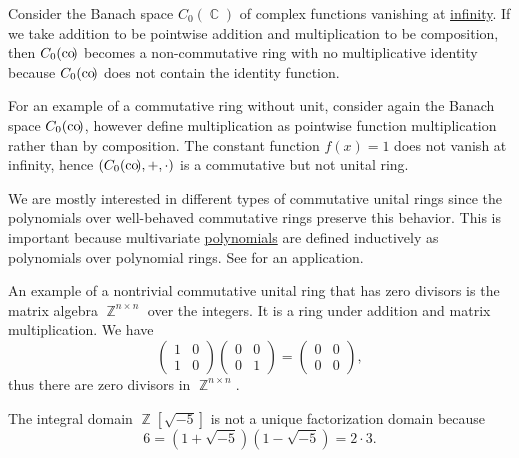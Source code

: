 \begin{example}
\begin{refenum}
     Consider the Banach space \( C_0(\BbbC) \) of complex functions vanishing at \hyperref[def:function_spaces/c0]{infinity}. If we take addition to be pointwise addition and multiplication to be composition, then \( C_0(\operatorname*{co\negthinspace)} \) becomes a non-commutative ring with no multiplicative identity because \( C_0(\operatorname*{co\negthinspace)} \) does not contain the identity function.

     For an example of a commutative ring without unit, consider again the Banach space \( C_0(\operatorname*{co\negthinspace)} \), however define multiplication as pointwise function multiplication rather than by composition. The constant function \( f(x) = 1 \) does not vanish at infinity, hence \( (C_0(\operatorname*{co\negthinspace)}, +, \cdot) \) is a commutative but not unital ring.

     We are mostly interested in different types of commutative unital rings since the polynomials over well-behaved commutative rings preserve this behavior. This is important because multivariate \hyperref[def:multivariate_polynomial]{polynomials} are defined inductively as polynomials over polynomial rings. See  for an application.

    An example of a nontrivial commutative unital ring that has zero divisors is the matrix algebra \( \BbbZ^{n \times n} \) over the integers. It is a ring under addition and matrix multiplication. We have
    \begin{equation*}
      \begin{pmatrix}
        1 & 0 \\
        1 & 0
      \end{pmatrix}
      \begin{pmatrix}
        0 & 0 \\
        0 & 1
      \end{pmatrix}
      =
      \begin{pmatrix}
        0 & 0 \\
        0 & 0
      \end{pmatrix},
    \end{equation*}
    thus there are zero divisors in \( \BbbZ^{n \times n} \).

    \cite[388]{Knapp2016BasicAlgebra} The integral domain \( \BbbZ[\sqrt{-5}] \) is not a unique factorization domain because
    \begin{equation*}
      6 = (1 + \sqrt{-5}) (1 - \sqrt{-5}) = 2 \cdot 3.
    \end{equation*}


\end{refenum}
\end{example}
